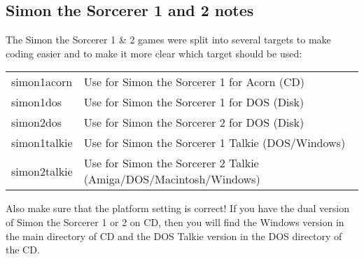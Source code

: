 \subsection{Simon the Sorcerer 1 and 2 notes}
The Simon the Sorcerer 1 \& 2 games were split into several targets to make
coding easier and to make it more clear which target should be used:

\begin{tabular}{ll}
       simon1acorn  & Use for Simon the Sorcerer 1 for Acorn (CD)\\
       simon1dos    & Use for Simon the Sorcerer 1 for DOS (Disk)\\
       simon2dos    & Use for Simon the Sorcerer 2 for DOS (Disk)\\
       simon1talkie & Use for Simon the Sorcerer 1 Talkie (DOS/Windows)\\
       simon2talkie & Use for Simon the Sorcerer 2 Talkie (Amiga/DOS/Macintosh/Windows)\\
\end{tabular}

Also make sure that the platform setting is correct!
If you have the dual version of Simon the Sorcerer 1 or 2 on CD,
then you will find the Windows version in the main directory of CD
and the DOS Talkie version in the DOS directory of the CD.
